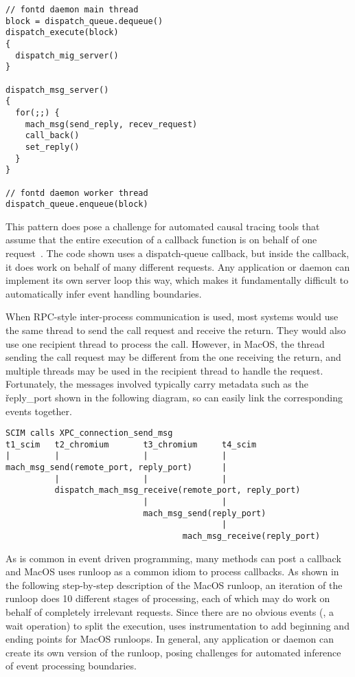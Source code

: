 {\footnotesize \begin{verbatim}
// fontd daemon main thread
block = dispatch_queue.dequeue()
dispatch_execute(block)
{
  dispatch_mig_server()
}

dispatch_msg_server()
{
  for(;;) {
    mach_msg(send_reply, recev_request)
    call_back()
    set_reply()
  }
}

// fontd daemon worker thread
dispatch_queue.enqueue(block)
\end{verbatim}
}

This pattern does pose a challenge for automated causal tracing tools that
assume that the entire execution of a callback function is on behalf of
one request~\cite{xxx}.  The code shown uses a dispatch-queue callback,
but inside the callback, it does work on behalf of many different
requests.  Any application or daemon can implement its  own server loop
this way, which makes it fundamentally difficult to automatically infer
event handling boundaries.

When RPC-style inter-process communication is used, most systems would use
the same thread to send the call request and receive the return.  They
would also use one recipient thread to process the call.  However, in
MacOS, the thread sending the call request may be different from the one
receiving the return, and multiple threads may be used in the recipient
thread to handle the request.  Fortunately, the messages involved
typically carry metadata such as the \v{reply\_port} shown in the
following diagram, so \xxx can easily link the corresponding events
together.

{\footnotesize \begin{verbatim}
SCIM calls XPC_connection_send_msg
t1_scim   t2_chromium       t3_chromium     t4_scim
|         |                 |               |
mach_msg_send(remote_port, reply_port)      |
          |                 |               |
          dispatch_mach_msg_receive(remote_port, reply_port)
                            |               |
                            mach_msg_send(reply_port)
                                            |
                                    mach_msg_receive(reply_port)
\end{verbatim}
}

As is common in event driven programming, many methods can post a callback
and MacOS uses runloop as a common idiom to process callbacks.  As shown
in the following step-by-step description of the MacOS runloop, an
iteration of the runloop does 10 different stages of processing, each of
which may do work on behalf of completely irrelevant requests.  Since
there are no obvious events (\eg, a wait operation) to split the
execution, \xxx uses instrumentation to add beginning and ending points
for MacOS runloops.  In general, any application or daemon can create
its own version of the runloop, posing challenges for automated
inference of event processing boundaries.

